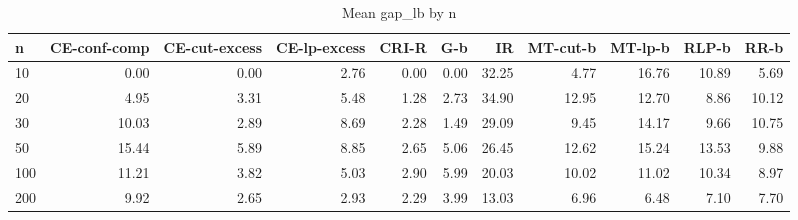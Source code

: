 \begin{table}[htbp]
\centering
\small
\caption{Mean gap\_lb by n}
\label{tab:E2b_head_to_head_budgets_b10_by_n}
\begin{tabular}{lrrrrrrrrrr}
\toprule
n & CE-conf-comp & CE-cut-excess & CE-lp-excess & CRI-R & G-b & IR & MT-cut-b & MT-lp-b & RLP-b & RR-b \\
\midrule
10 & 0.00 & 0.00 & 2.76 & 0.00 & 0.00 & 32.25 & 4.77 & 16.76 & 10.89 & 5.69 \\
20 & 4.95 & 3.31 & 5.48 & 1.28 & 2.73 & 34.90 & 12.95 & 12.70 & 8.86 & 10.12 \\
30 & 10.03 & 2.89 & 8.69 & 2.28 & 1.49 & 29.09 & 9.45 & 14.17 & 9.66 & 10.75 \\
50 & 15.44 & 5.89 & 8.85 & 2.65 & 5.06 & 26.45 & 12.62 & 15.24 & 13.53 & 9.88 \\
100 & 11.21 & 3.82 & 5.03 & 2.90 & 5.99 & 20.03 & 10.02 & 11.02 & 10.34 & 8.97 \\
200 & 9.92 & 2.65 & 2.93 & 2.29 & 3.99 & 13.03 & 6.96 & 6.48 & 7.10 & 7.70 \\
\bottomrule
\end{tabular}
\end{table}

